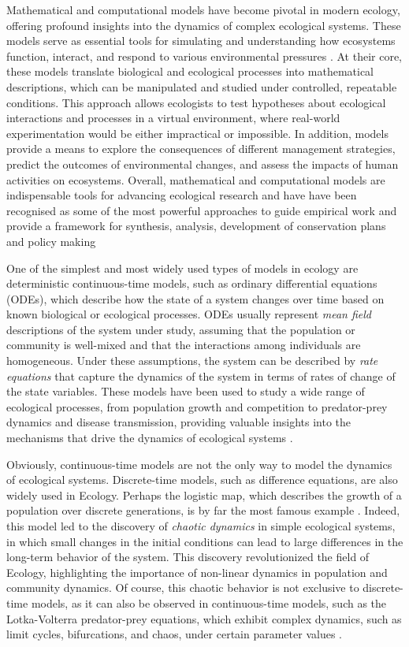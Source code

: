 Mathematical and computational models have become pivotal in modern ecology,
offering profound insights into the dynamics of complex ecological systems.
These models serve as essential tools for simulating and understanding how
ecosystems function, interact, and respond to various environmental pressures
\cite{HOCH19983}. At their core, these models translate biological and
ecological processes into mathematical descriptions, which can be manipulated
and studied under controlled, repeatable conditions. This approach allows
ecologists to test hypotheses about ecological interactions and processes in a
virtual environment, where real-world experimentation would be either
impractical or impossible. In addition, models provide a means to explore the
consequences of different management strategies, predict the outcomes of
environmental changes, and assess the impacts of human activities on
ecosystems. Overall, mathematical and computational models are indispensable
tools for advancing ecological research and have have been recognised as some
of the most powerful approaches to guide empirical work and provide a framework
for synthesis, analysis, development of conservation plans and policy making
\cite{levin1992mathematics,Murray_book,sarkar2006biodiversity}

One of the simplest and most widely used types of models in ecology are
deterministic continuous-time models, such as ordinary differential equations
(ODEs), which describe how the state of a system changes over time based on
known biological or ecological processes. ODEs usually represent \textit{mean
  field} descriptions of the system under study, assuming that the population
or community is well-mixed and that the interactions among individuals are
homogeneous. Under these assumptions, the system can be described by
\textit{rate equations} that capture the dynamics of the system in terms of
rates of change of the state variables. These models have been used to study a
wide range of ecological processes, from population growth and competition to
predator-prey dynamics and disease transmission, providing valuable insights
into the mechanisms that drive the dynamics of ecological systems
\cite{Murray_book}.

Obviously, continuous-time models are not the only way to model the dynamics of
ecological systems. Discrete-time models, such as difference equations, are
also widely used in Ecology. Perhaps the logistic map, which describes the
growth of a population over discrete generations, is by far the most famous
example \cite{May1974}. Indeed, this model led to the discovery of
\textit{chaotic dynamics} in simple ecological systems, in which small changes
in the initial conditions can lead to large differences in the long-term
behavior of the system. This discovery revolutionized the field of Ecology,
highlighting the importance of non-linear dynamics in population and community
dynamics. Of course, this chaotic behavior is not exclusive to discrete-time
models, as it can also be observed in continuous-time models, such as the
Lotka-Volterra predator-prey equations, which exhibit complex dynamics, such as
limit cycles, bifurcations, and chaos, under certain parameter values
\cite{Murray_book}.


